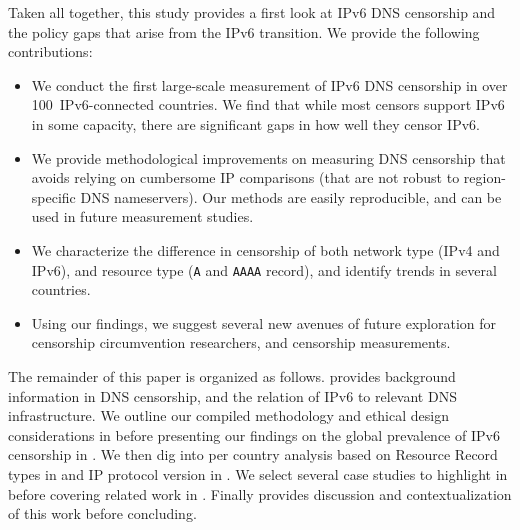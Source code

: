 Taken all together, this study provides a first look at IPv6 DNS censorship and
the policy gaps that arise from the IPv6 transition. We provide the following
contributions:

\begin{itemize}
    \item
    We conduct the first large-scale measurement of IPv6 DNS censorship in over
    100~IPv6-connected countries. We find that while most censors support IPv6
    in some capacity, there are significant gaps in how well they censor IPv6.

    \item We provide methodological improvements on measuring DNS censorship
    that avoids relying on cumbersome IP comparisons (that are not
    robust to region-specific DNS nameservers). Our methods are easily
    reproducible, and can be used in future measurement studies.

    \item We characterize the difference in censorship of both network type
    (IPv4 and IPv6), and resource type ({\tt A} and {\tt AAAA} record), and
    identify trends in several countries.

    \item Using our findings, we suggest several new avenues of future
    exploration for censorship circumvention researchers, and censorship
    measurements.

\end{itemize}

The remainder of this paper is organized as follows.  provides
background information in DNS censorship, and the relation of IPv6 to relevant DNS
infrastructure. We outline our compiled methodology and ethical design
considerations in  before presenting our findings on the
global prevalence of IPv6 censorship in . We then dig into
per country analysis based on Resource Record types in  and
IP protocol version in . We select several case studies
to highlight in  before covering related work in
. Finally  provides discussion and
contextualization of this work before concluding.
\fi

